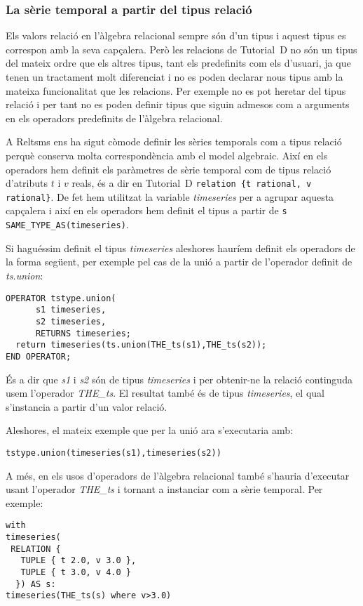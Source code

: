 \subsubsection{La sèrie temporal a partir del tipus relació}



Els valors relació en l'àlgebra relacional sempre són d'un tipus i
aquest tipus es correspon amb la seva capçalera. Però les relacions de
Tutorial~D no són un tipus del mateix ordre que els altres tipus, tant
els predefinits com els d'usuari, ja que tenen un tractament molt
diferenciat i no es poden declarar nous tipus amb la mateixa
funcionalitat que les relacions.  Per exemple no es pot heretar del
tipus relació i per tant no es poden definir tipus que siguin admesos
com a arguments en els operadors predefinits de l'àlgebra relacional.


A Reltsms ens ha sigut còmode definir les sèries temporals com a tipus
relació perquè conserva molta correspondència amb el model algebraic.
Així en els operadors hem definit els paràmetres de sèrie temporal com
de tipus relació d'atributs $t$ i $v$ reals, és a dir en Tutorial~D %
\lstinline[style=tutorialD]+relation {t rational, v rational}+. %
De fet hem utilitzat la variable \emph{timeseries} per a agrupar
aquesta capçalera i així en els operadors hem definit el tipus a
partir de %
\lstinline[style=tutorialD]+s SAME_TYPE_AS(timeseries)+.%


Si haguéssim definit el tipus \emph{timeseries} aleshores hauríem
definit els operadors de la forma següent, per exemple pel cas de la
unió a partir de l'operador definit de \emph{ts.union}:
\begin{lstlisting}[style=tutorialD]
OPERATOR tstype.union(
      s1 timeseries, 
      s2 timeseries, 
      RETURNS timeseries;
  return timeseries(ts.union(THE_ts(s1),THE_ts(s2));
END OPERATOR;
\end{lstlisting}

És a dir que \emph{s1} i \emph{s2} són de tipus \emph{timeseries} i
per obtenir-ne la relació continguda usem l'operador \emph{THE\_ts}. El
resultat també és de tipus \emph{timeseries}, el qual s'instancia a
partir d'un valor relació.

Aleshores, el mateix exemple que per la unió ara s'executaria amb:
\begin{lstlisting}[style=tutorialD]
tstype.union(timeseries(s1),timeseries(s2))
\end{lstlisting}

A més, en els usos d'operadors de l'àlgebra relacional també s'hauria
d'executar usant l'operador \emph{THE\_ts} i tornant a instanciar com
a sèrie temporal. Per exemple:
\begin{lstlisting}[style=tutorialD]
with
timeseries(
 RELATION {
   TUPLE { t 2.0, v 3.0 },
   TUPLE { t 3.0, v 4.0 }
  }) AS s:
timeseries(THE_ts(s) where v>3.0)
\end{lstlisting}

